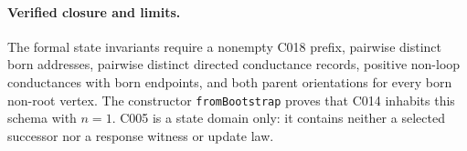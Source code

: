 \paragraph*{Verified closure and limits.}
The formal state invariants require a nonempty C018 prefix, pairwise distinct
born addresses, pairwise distinct directed conductance records, positive
non-loop conductances with born endpoints, and both parent orientations for
every born non-root vertex.  The constructor \texttt{fromBootstrap} proves
that C014 inhabits this schema with $n=1$.  C005 is a state domain only: it
contains neither a selected successor nor a response witness or update law.
